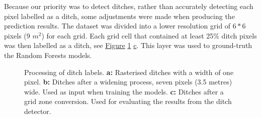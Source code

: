 \documentclass[]{interact}
\theoremstyle{plain}%
\theoremstyle{definition}
\theoremstyle{remark}
\begin{document}
Because our priority was to detect ditches, rather than accurately detecting each pixel labelled as a ditch, some adjustments were made when producing the prediction results. The dataset was divided into a lower resolution grid of $6*6$ pixels (9 $m^2$) for each grid. Each grid cell that contained at least 25\% ditch pixels was then labelled as a ditch, see \hyperref[fig:ditchpreprocess]{Figure} \ref{fig:ditchpreprocess} \hyperref[fig:ditchpreprocess]{c}. This layer was used to ground-truth the Random Forests models.

\begin{figure} [htb!]
    \centering
    \hspace{5pt}
    \caption{Processing of ditch labels. \textbf{a: }Rasterised ditches with a width of one pixel. \textbf{b: }Ditches after a widening process, seven pixels (3.5 metres) wide. Used as input when training the models. \textbf{c: }Ditches after a grid zone conversion. Used for evaluating the results from the ditch detector.} \label{sample-figure}
    \label{fig:ditchpreprocess}
\end{figure}
\end{document}
